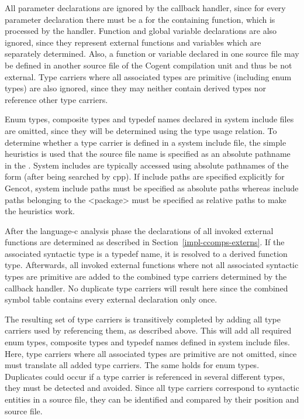 All parameter declarations are ignored by the callback handler, since for every parameter declaration there must be 
a  for the containing function, which is processed by the handler. Function and global variable declarations 
are also ignored, since they represent external functions and variables which are separately determined. Also,
a function or variable declared in one source file may be defined in another source file of the Cogent compilation unit and thus 
be not external. Type carriers where all associated types are primitive (including enum types) are also ignored, 
since they may neither contain derived types nor reference other type carriers.

Enum types, composite types and typedef names declared in system include files are omitted, since they will be determined 
using the type usage relation. To determine whether
a type carrier is defined in a system include file, the simple heuristics is used that the source file name is specified
as an absolute pathname in the . System includes are typically accessed using absolute pathnames of the 
form  (after being searched by cpp). If include paths are specified explicitly for Gencot, 
system include paths must be 
specified as absolute paths whereas include paths belonging to the <package> must be specified as relative paths
to make the heuristics work.

After the language-c analysis phase the declarations of all invoked external functions are determined 
as described in Section~\ref{impl-ccomps-externs}. If the associated syntactic type is a typedef name, it is resolved
to a derived function type. Afterwards, all invoked external functions where not all associated syntactic types
are primitive are added to the combined type carriers determined by the callback handler. No duplicate type carriers
will result here since the combined symbol table contains every external declaration only once.

The resulting set of type carriers is transitively completed by adding all type carriers used by referencing them,
as described above. This will add all required enum types, composite types and typedef names defined in system include files.
Here, type carriers where all associated types are primitive are not omitted, since 
 must translate all added type carriers. The same holds for enum types. 
Duplicates could occur if a type carrier is referenced
in several different types, they must be detected and avoided. Since all type carriers correspond to 
syntactic entities in a source file, they can be identified and compared by their position and source file.

